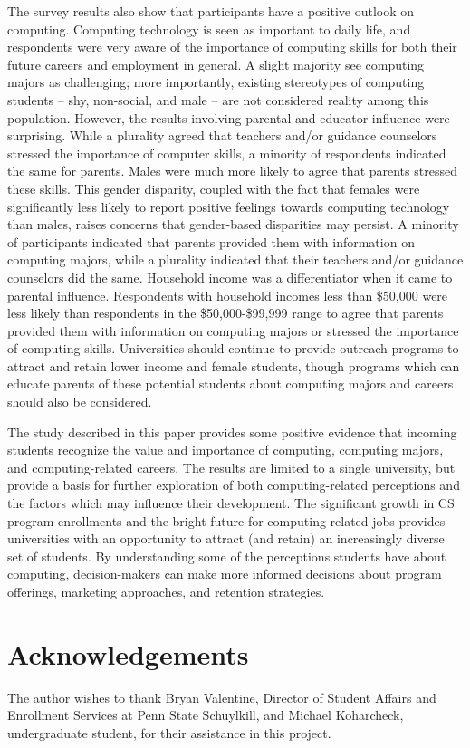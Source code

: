 \documentclass{article}
\begin{document}
The survey results also show that participants have a positive outlook on computing. Computing technology is seen as important to daily life, and respondents were very aware of the importance of computing skills for both their future careers and employment in general. A slight majority see computing majors as challenging; more importantly, existing stereotypes of computing students – shy, non-social, and male – are not considered reality among this population. However, the results involving parental and educator influence were surprising. While a plurality agreed that teachers and/or guidance counselors stressed the importance of computer skills, a minority of respondents indicated the same for parents. Males were much more likely to agree that parents stressed these skills. This gender disparity, coupled with the fact that females were significantly less likely to report positive feelings towards computing technology than males, raises concerns that gender-based disparities may persist. A minority of participants indicated that parents provided them with information on computing majors, while a plurality indicated that their teachers and/or guidance counselors did the same. Household income was a differentiator when it came to parental influence. Respondents with household incomes less than \$50,000 were less likely than respondents in the \$50,000-\$99,999 range to agree that parents provided them with information on computing majors or stressed the importance of computing skills. Universities should continue to provide outreach programs to attract and retain lower income and female students, though programs which can educate parents of these potential students about computing majors and careers should also be considered.

The study described in this paper provides some positive evidence that incoming students recognize the value and importance of computing, computing majors, and computing-related careers. The results are limited to a single university, but provide a basis for further exploration of both computing-related perceptions and the factors which may influence their development. The significant growth in CS program enrollments and the bright future for computing-related jobs provides universities with an opportunity to attract (and retain) an increasingly diverse set of students. By understanding some of the perceptions students have about computing, decision-makers can make more informed decisions about program offerings, marketing approaches, and retention strategies.

\section{Acknowledgements}
The author wishes to thank Bryan Valentine, Director of Student Affairs and Enrollment Services at Penn State Schuylkill, and Michael Koharcheck, undergraduate student, for their assistance in this project.
\medskip



\end{document}
